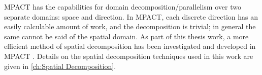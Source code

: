 {{        MPACT has the capabilities for domain decomposition/parallelism over two separate domains: space and direction.
        In MPACT, each discrete direction has an easily calculable amount of work, and the decomposition is trivial; in general the same cannot be said of the spatial domain.
        As part of this thesis work, a more efficient method of spatial decomposition has been investigated and developed in MPACT \cite{Fitzgerald2019a}.
        Details on the spatial decomposition techniques used in this work are given in \cref{ch:Spatial Decomposition}.
    }



    \printbibliography
}